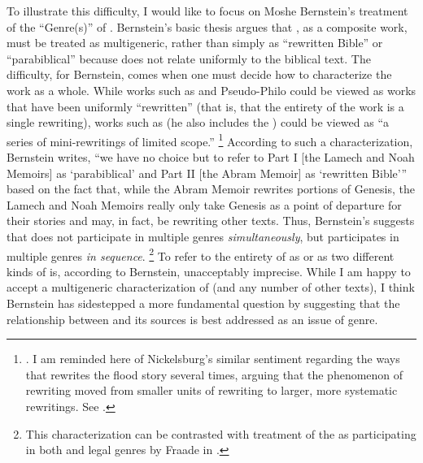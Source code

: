 To illustrate this difficulty, I would like to focus on Moshe Bernstein's treatment of the ``Genre(s)'' of \ga.%
    \autocite[As argued in][]{bernstein_berthelot-etal2010}
Bernstein's basic thesis argues that \ga, as a composite work, must be treated as multigeneric, rather than simply as ``rewritten Bible'' or ``parabiblical'' because \ga does not relate uniformly to the biblical text. The difficulty, for Bernstein, comes when one must decide how to characterize the work as a whole. While works such as \jub and Pseudo-Philo could be viewed as works that have been uniformly ``rewritten'' (that is, that the entirety of the work is a single rewriting), works such as \ga (he also includes the \templescroll) could be viewed as ``a series of mini-rewritings of limited scope.''%
    \footnote{\Cite[336]{bernstein_berthelot-etal2010}. I am reminded here of Nickelsburg's similar sentiment regarding the ways that \firstenoch rewrites the flood story several times, arguing that the phenomenon of rewriting moved from smaller units of rewriting to larger, more systematic rewritings. See \cite[89--90]{nickelsburg_stone1984}.}
According to such a characterization, Bernstein writes, ``we have no choice but to refer to Part I [the Lamech and Noah Memoirs] as `parabiblical' and Part II [the Abram Memoir] as `rewritten Bible''' based on the fact that, while the Abram Memoir rewrites portions of Genesis, the Lamech and Noah Memoirs really only take Genesis as a point of departure for their stories and may, in fact, be rewriting other texts.%
    \autocite[337]{bernstein_berthelot-etal2010}
Thus, Bernstein's suggests that \ga does not participate in multiple genres \emph{simultaneously}, but participates in multiple genres \emph{in sequence}.%
    \footnote{This characterization can be contrasted with treatment of the \templescroll as participating in both \rwb and legal genres by Fraade in \cite*{fraade_goldstein-etal2017}.}
To refer to the entirety of \ga as \rwb or as two different kinds of \rwb is, according to Bernstein, unacceptably imprecise. While I am happy to accept a multigeneric characterization of \ga (and any number of other texts), I think Bernstein has sidestepped a more fundamental question by suggesting that the relationship between \ga and its sources is best addressed as an issue of genre. 

